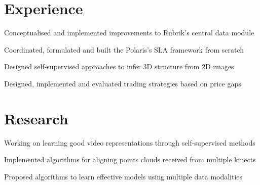 \documentclass[]{cv-openfont}
\begin{document}
\begin{minipage}[t]{0.67\textwidth} 


\section{Experience}
\vspace{\topsep} %
\begin{tightemize}
\item Conceptualised and implemented improvements to Rubrik's central data module\\
\item Coordinated, formulated and built the Polaris's SLA framework from scratch
\end{tightemize}
\sectionsep

Designed self-supervised approaches to infer 3D structure from 2D images
\sectionsep

Designed, implemented and evaluated trading strategies based on price gaps
\sectionsep


\section{Research}

\rdescript{}
Working on learning good video representations through self-supervised methods
\sectionsep

Implemented algorithms for aligning points clouds received from multiple kinects
\sectionsep

Proposed algorithms to learn effective models using multiple data modalities
\sectionsep


\end{minipage}
\end{document}

